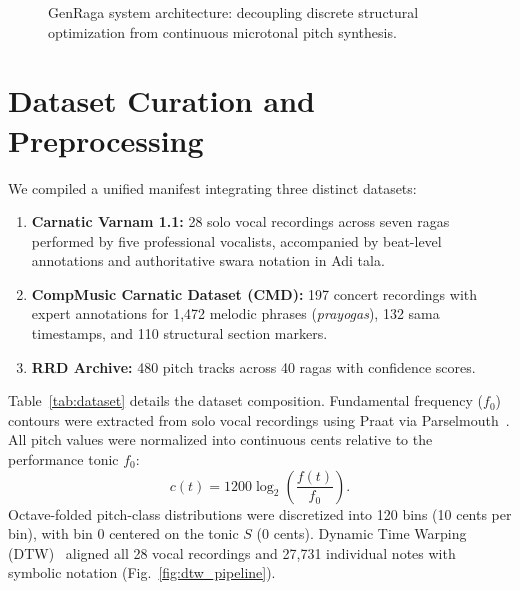 \documentclass[12pt,a4paper]{report}
\begin{document}
\begin{figure}[h!]
\centering
{}
\caption{GenRaga system architecture: decoupling discrete structural optimization from continuous microtonal pitch synthesis.}
\label{fig:arch}
\end{figure}

\section{Dataset Curation and Preprocessing}
We compiled a unified manifest integrating three distinct datasets:
\begin{enumerate}
    \item \textbf{Carnatic Varnam 1.1:} 28 solo vocal recordings across seven ragas performed by five professional vocalists, accompanied by beat-level annotations and authoritative swara notation in Adi tala.
    \item \textbf{CompMusic Carnatic Dataset (CMD):} 197 concert recordings with expert annotations for 1,472 melodic phrases (\textit{prayogas}), 132 sama timestamps, and 110 structural section markers.
    \item \textbf{RRD Archive:} 480 pitch tracks across 40 ragas with confidence scores.
\end{enumerate}

Table~\ref{tab:dataset} details the dataset composition. Fundamental frequency ($f_0$) contours were extracted from solo vocal recordings using Praat via Parselmouth~\cite{jadoul2018}. All pitch values were normalized into continuous cents relative to the performance tonic $f_0$:
\begin{equation}
 c(t) = 1200 \log_2\!\left(\frac{f(t)}{f_0}\right).
\end{equation}
Octave-folded pitch-class distributions were discretized into 120 bins (10 cents per bin), with bin 0 centered on the tonic $S$ (0 cents). Dynamic Time Warping (DTW)~\cite{sakoe1978} aligned all 28 vocal recordings and 27,731 individual notes with symbolic notation (Fig.~\ref{fig:dtw_pipeline}).
\end{document}
